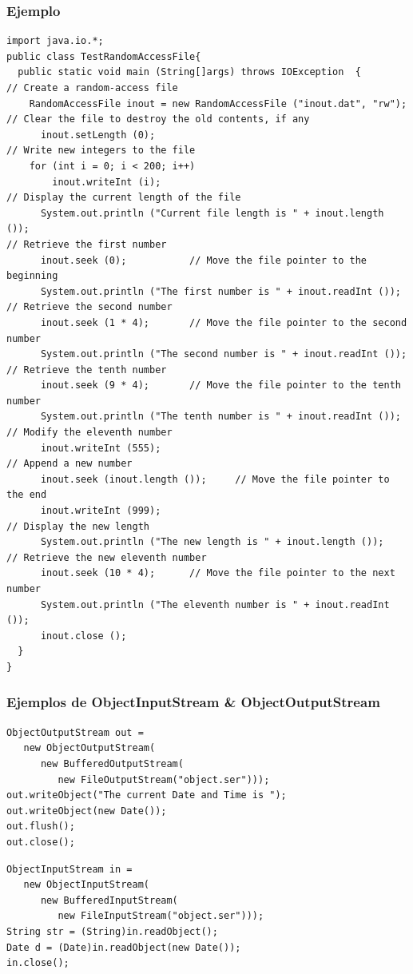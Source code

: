 \documentclass{beamer}
\begin{document}
\begin{frame}[fragile]
\frametitle{Ejemplo}
\begin{tiny}
\begin{verbatim}
import java.io.*;
public class TestRandomAccessFile{
  public static void main (String[]args) throws IOException  {
// Create a random-access file
    RandomAccessFile inout = new RandomAccessFile ("inout.dat", "rw");
// Clear the file to destroy the old contents, if any
      inout.setLength (0);
// Write new integers to the file
    for (int i = 0; i < 200; i++)
        inout.writeInt (i);
// Display the current length of the file
      System.out.println ("Current file length is " + inout.length ());
// Retrieve the first number
      inout.seek (0);           // Move the file pointer to the beginning
      System.out.println ("The first number is " + inout.readInt ());
// Retrieve the second number
      inout.seek (1 * 4);       // Move the file pointer to the second number
      System.out.println ("The second number is " + inout.readInt ());
// Retrieve the tenth number
      inout.seek (9 * 4);       // Move the file pointer to the tenth number
      System.out.println ("The tenth number is " + inout.readInt ());
// Modify the eleventh number
      inout.writeInt (555);
// Append a new number
      inout.seek (inout.length ());     // Move the file pointer to the end
      inout.writeInt (999);
// Display the new length
      System.out.println ("The new length is " + inout.length ());
// Retrieve the new eleventh number
      inout.seek (10 * 4);      // Move the file pointer to the next number
      System.out.println ("The eleventh number is " + inout.readInt ());
      inout.close ();
  }
}
\end{verbatim}
\end{tiny}
\end{frame}


\begin{frame}[fragile]
\frametitle{Ejemplos de ObjectInputStream \& ObjectOutputStream}
\begin{verbatim}
ObjectOutputStream out =
   new ObjectOutputStream(
      new BufferedOutputStream(
         new FileOutputStream("object.ser")));
out.writeObject("The current Date and Time is "); 
out.writeObject(new Date());                      
out.flush();
out.close();
\end{verbatim}
\pause
\begin{verbatim}
ObjectInputStream in = 
   new ObjectInputStream(
      new BufferedInputStream(
         new FileInputStream("object.ser")));
String str = (String)in.readObject();
Date d = (Date)in.readObject(new Date());  
in.close();
\end{verbatim}
\end{frame}
\end{document}
